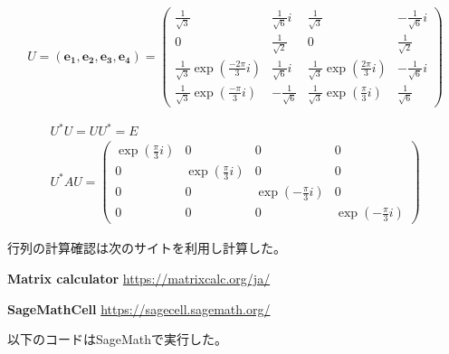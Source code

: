 \documentclass[10pt,b5paper]{ltjsarticle}
\begin{document}
\begin{equation}
 U=(\bm{e_1}, \bm{e_2}, \bm{e_3}, \bm{e_4}) =
  \begin{pmatrix}
   \frac{1}{\sqrt{3}} & \frac{1}{\sqrt{6}}i & \frac{1}{\sqrt{3}} & -\frac{1}{\sqrt{6}}i\\
                    0 &   \frac{1}{\sqrt{2}} &                  0 &  \frac{1}{\sqrt{2}}\\
   \frac{1}{\sqrt{3}}\exp{(\frac{-2\pi}{3}i)} & \frac{1}{\sqrt{6}}i
           & \frac{1}{\sqrt{3}}\exp{(\frac{2\pi}{3}i)} & -\frac{1}{\sqrt{6}}i\\
    \frac{1}{\sqrt{3}}\exp{(\frac{-\pi}{3}i)} & -\frac{1}{\sqrt{6}}
           &  \frac{1}{\sqrt{3}}\exp{(\frac{\pi}{3}i)} & \frac{1}{\sqrt{6}}
  \end{pmatrix}
\end{equation}


\begin{gather}
 U^{*}U=UU^{*}=E\\
 U^{*}AU=
 \begin{pmatrix}
  \exp{(\frac{\pi}{3}i)} & 0 & 0 & 0\\
  0 & \exp{(\frac{\pi}{3}i)} & 0 & 0\\
  0 & 0 & \exp{(-\frac{\pi}{3}i)} & 0\\
  0 & 0 & 0 & \exp{(-\frac{\pi}{3}i)}
 \end{pmatrix}
\end{gather}


\hrulefill

行列の計算確認は次のサイトを利用し計算した。

\textbf{Matrix calculator}
\quad
\url{https://matrixcalc.org/ja/}

\textbf{SageMathCell}
\quad
\url{https://sagecell.sagemath.org/}

以下のコードはSageMathで実行した。
\end{document}
